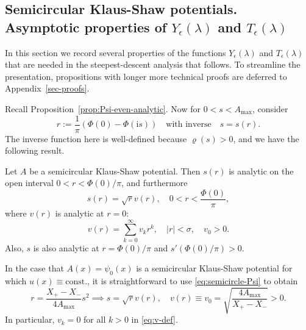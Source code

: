\documentclass[12pt]{amsart}
\numberwithin{equation}{section}
\newcommand{\ii}{\mathrm{i}}
\newcommand{\SP}{\lambda}
\newcommand{\phaseint}{\Phi}
\newcommand{\evdensity}{\varrho}
\newcommand{\rr}{r}
\begin{document}
\subsection{Semicircular Klaus-Shaw potentials.  Asymptotic properties of $Y_\epsilon(\SP)$ and $T_\epsilon(\SP)$}
\label{sec-prop-YT}

In this section we record several properties of the functions $Y_\epsilon(\SP)$ and $T_\epsilon(\SP)$ that are needed in the steepest-descent analysis that follows. To streamline the presentation, propositions with longer more technical proofs are deferred to Appendix~\ref{sec-proofs}. 

Recall Proposition~\ref{prop:Psi-even-analytic}.  
Now for $0<s<A_\mathrm{max}$, consider 
\begin{equation}
\rr:=\frac{1}{\pi}(\phaseint(0)-\phaseint(\ii s))\quad\text{with inverse}\quad s=s(\rr).
\label{eq:t-and-s-defs}
\end{equation}
The inverse function here is well-defined because $\evdensity(s)>0$, and we have the following result.
\begin{lem}
Let $A$ be a semicircular Klaus-Shaw potential.  Then $s(\rr)$ is analytic on the open interval $0<\rr<\phaseint(0)/\pi$, and furthermore
\begin{equation}
s(\rr)=\sqrt{\rr}v(\rr),\quad 0<\rr<\frac{\phaseint(0)}{\pi},
\label{eq:s-in-terms-of-v}
\end{equation}
where $v(\rr)$ is analytic at $\rr=0$:
\begin{equation}
v(\rr)=\sum_{k=0}^\infty v_k\rr^k,\quad |\rr|<\sigma,\quad v_0>0.
\label{eq:v-def}
\end{equation}
Also, $s$ is also analytic at $\rr=\phaseint(0)/\pi$ and 
$s'(\phaseint(0)/\pi)>0$.
\label{lem:s-properties}
\end{lem}
\begin{rem}
In the case that $A(x)=\psi_0(x)$ is a semicircular Klaus-Shaw potential for which $u(x)\equiv\text{const.}$, it is straightforward to use \eqref{eq:semicircle-Psi}  to obtain
\begin{equation}
\rr = \frac{X_+-X_-}{4A_\mathrm{max}}s^2\implies s =\sqrt{\rr}v(\rr),\quad v(\rr)\equiv v_0=\sqrt{\frac{4A_\mathrm{max}}{X_+-X_-}}>0.
\end{equation}
In particular, $v_k=0$ for all $k>0$ in \eqref{eq:v-def}.
\label{rem:v-for-exact-semicircle}
\end{rem}
\end{document}
